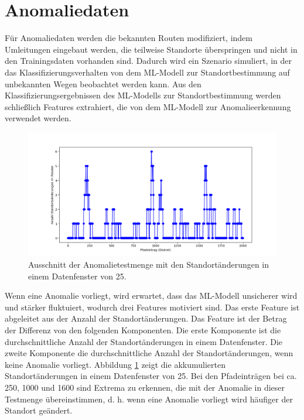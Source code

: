 \section{Anomaliedaten}
\label{sec:data_anomalie}
Für Anomaliedaten werden die bekannten Routen modifiziert, indem Umleitungen eingebaut werden, die teilweise Standorte überspringen
und nicht in den Trainingsdaten vorhanden sind.
Dadurch wird ein Szenario simuliert, in der das Klassifizierungsverhalten von dem ML-Modell zur Standortbestimmung auf unbekannten Wegen beobachtet werden kann.
Aus den Klassifizierungsergebnissen des ML-Modells zur Standortbestimmung werden schließlich Features extrahiert,
die von dem ML-Modell zur Anomalieerkennung verwendet werden.
\begin{figure}[h!]
    \centering
    \includegraphics[width=\linewidth]{images/feature_window_location_changes.png}
    \caption{Ausschnitt der Anomalietestmenge mit den Standortänderungen in einem Datenfenster von 25.}
    \label{fig:window_location_changes}
\end{figure}
\newpage
Wenn eine Anomalie vorliegt, wird erwartet, dass das ML-Modell unsicherer wird und stärker fluktuiert,
wodurch drei Features motiviert sind.
Das erste Feature ist abgeleitet aus der Anzahl der Standortänderungen.
Das Feature ist der Betrag der Differenz von den folgenden Komponenten.
Die erste Komponente ist die durchschnittliche Anzahl der Standortänderungen in einem Datenfenster.
Die zweite Komponente die durchschnittliche Anzahl der Standortänderungen, wenn keine Anomalie vorliegt.
Abbildung \ref{fig:window_location_changes} zeigt die akkumulierten Standortänderungen in einem Datenfenster von 25.
Bei den Pfadeinträgen bei ca. 250, 1000 und 1600 sind Extrema zu erkennen, die mit der Anomalie in dieser Testmenge übereinstimmen,
d. h. wenn eine Anomalie vorliegt wird häufiger der Standort geändert.
\newline
\newline

